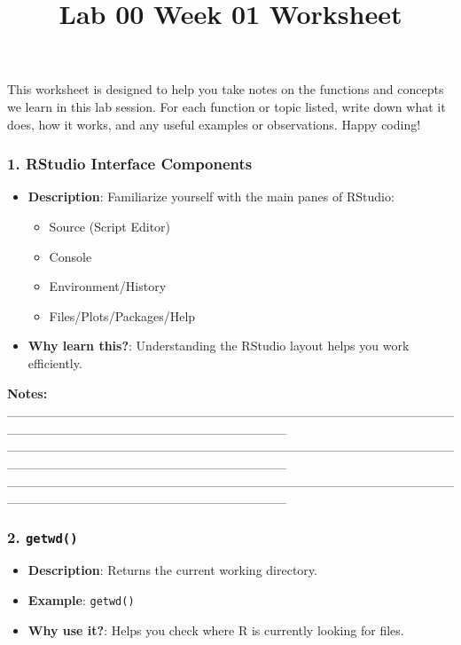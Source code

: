 \documentclass[
  11pt,
]{article}
\title{Lab 00 Week 01 Worksheet}
\author{}
\date{\vspace{-2.5em}}
\providecommand{\tightlist}{%
  \setlength{\itemsep}{0pt}\setlength{\parskip}{0pt}}
\begin{document}
\maketitle

This worksheet is designed to help you take notes on the functions and
concepts we learn in this lab session. For each function or topic
listed, write down what it does, how it works, and any useful examples
or observations. Happy coding!

\subsubsection{1. RStudio Interface
Components}\label{rstudio-interface-components}

\begin{itemize}
\tightlist
\item
  \textbf{Description}: Familiarize yourself with the main panes of
  RStudio:

  \begin{itemize}
  \tightlist
  \item
    Source (Script Editor)
  \item
    Console
  \item
    Environment/History
  \item
    Files/Plots/Packages/Help
  \end{itemize}
\item
  \textbf{Why learn this?}: Understanding the RStudio layout helps you
  work efficiently.
\end{itemize}

\textbf{Notes:}
\_\_\_\_\_\_\_\_\_\_\_\_\_\_\_\_\_\_\_\_\_\_\_\_\_\_\_\_\_\_\_\_\_\_\_\_\_\_\_\_\_\_\_\_\_\_\_\_\_\_\_\_\_\_\_\_\_\_\_\_\_\_\_\_\_\_\_\_\_\_\_\_\_\_\_\_\_\_
\_\_\_\_\_\_\_\_\_\_\_\_\_\_\_\_\_\_\_\_\_\_\_\_\_\_\_\_\_\_\_\_\_\_\_\_\_\_\_\_\_\_\_\_\_\_\_\_\_\_\_\_\_\_\_\_\_\_\_\_\_\_\_\_\_\_\_\_\_\_\_\_\_\_\_\_\_\_
\_\_\_\_\_\_\_\_\_\_\_\_\_\_\_\_\_\_\_\_\_\_\_\_\_\_\_\_\_\_\_\_\_\_\_\_\_\_\_\_\_\_\_\_\_\_\_\_\_\_\_\_\_\_\_\_\_\_\_\_\_\_\_\_\_\_\_\_\_\_\_\_\_\_\_\_\_\_

\subsubsection{\texorpdfstring{2.
\texttt{getwd()}}{2. getwd()}}\label{getwd}

\begin{itemize}
\tightlist
\item
  \textbf{Description}: Returns the current working directory.
\item
  \textbf{Example}: \texttt{getwd()}
\item
  \textbf{Why use it?}: Helps you check where R is currently looking for
  files.
\end{itemize}
\end{document}
